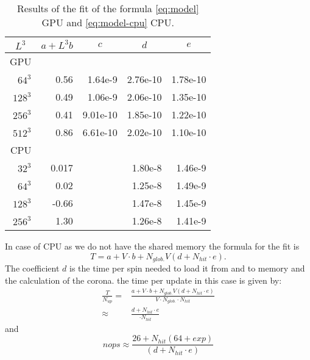 \documentclass[a4paper]{llncs}
\begin{document}
\begin{table}
\begin{center}
\begin{tabular}{||r|D{.}{.}{8}|D{.}{.}{8}|D{.}{.}{8}|D{.}{.}{8}||}
\hline\hline
{} 
& 
& 
& 
&\\\hline\hline
GPU & \\\hline
$64^3$  & 0.56  & 1.64e-9       & 	2.76e-10       & 1.78e-10 \\
$128^3$ & 0.49  & 1.06e-9       &	2.06e-10       & 1.35e-10 \\
$256^3$ & 0.41  & 9.01e-10	&       1.85e-10       & 1.22e-10\\
$512^3$ & 0.86  & 6.61e-10	&       2.02e-10       & 1.10e-10\\\hline\hline
CPU & \\\hline
$32^3$  &  0.017&       & 	1.80e-8 &	1.46e-9\\
$64^3$  &  0.02 &       & 	1.25e-8 &	1.49e-9\\
$128^3$ & -0.66 &       &	1.47e-8 & 	1.45e-9\\
$256^3$ & 1.30  &       &	1.26e-8 & 1.41e-9\\\hline\hline
\end{tabular}
\end{center}
\caption{\label{tab:fit}Results of the fit of the formula \eqref{eq:model} GPU and \eqref{eq:model-cpu} CPU.}
\end{table}
In case of CPU as we do not have the shared memory the formula for the fit is
\begin{equation}\label{eq:model-cpu}
T  = a+ V \cdot b +
N_{glob.} V \left(d + N_{hit}\cdot e\right) . 
\end{equation}
The coefficient $d$ is the time per spin needed to load it from and to
memory and the calculation of the corona. the time per update  in this case is given by:
\begin{equation}\begin{split}
\frac{T}{N_{up}}=&\frac{a+ V \cdot b + N_{glob.} V \left(d + N_{hit}\cdot e\right)}{V\cdot N_{glob.}\cdot N_{hit}}\\
\approx&
\frac{d + N_{hit}\cdot e}{\cdot N_{hit}}
\end{split}
\end{equation}
and
\begin{equation}
nops\approx \frac{ 26+N_{hit}(64+exp)}{ \left(d + N_{hit}\cdot e\right)}
\end{equation}
\end{document}
